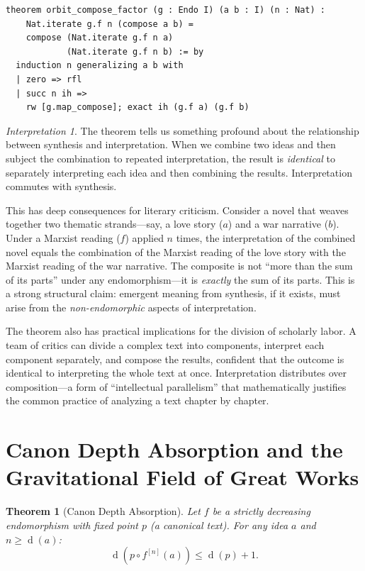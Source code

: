 \documentclass[11pt,openany]{book}
\theoremstyle{definition}
\theoremstyle{plain}
\newtheorem{theorem}[axiom]{Theorem}
\theoremstyle{remark}
\newtheorem{interpretation}[axiom]{Interpretation}
\newcommand{\compose}{\circ}                 %
\newcommand{\depth}{\operatorname{d}}       %
\begin{document}
\begin{lstlisting}[language=Lean4]
theorem orbit_compose_factor (g : Endo I) (a b : I) (n : Nat) :
    Nat.iterate g.f n (compose a b) =
    compose (Nat.iterate g.f n a)
            (Nat.iterate g.f n b) := by
  induction n generalizing a b with
  | zero => rfl
  | succ n ih =>
    rw [g.map_compose]; exact ih (g.f a) (g.f b)
\end{lstlisting}

\begin{interpretation}
The theorem tells us something profound about the relationship between synthesis and interpretation. When we combine two ideas and then subject the combination to repeated interpretation, the result is \emph{identical} to separately interpreting each idea and then combining the results. Interpretation commutes with synthesis.

This has deep consequences for literary criticism. Consider a novel that weaves together two thematic strands---say, a love story ($a$) and a war narrative ($b$). Under a Marxist reading ($f$) applied $n$ times, the interpretation of the combined novel equals the combination of the Marxist reading of the love story with the Marxist reading of the war narrative. The composite is not ``more than the sum of its parts'' under any endomorphism---it is \emph{exactly} the sum of its parts. This is a strong structural claim: emergent meaning from synthesis, if it exists, must arise from the \emph{non-endomorphic} aspects of interpretation.

The theorem also has practical implications for the division of scholarly labor. A team of critics can divide a complex text into components, interpret each component separately, and compose the results, confident that the outcome is identical to interpreting the whole text at once. Interpretation distributes over composition---a form of ``intellectual parallelism'' that mathematically justifies the common practice of analyzing a text chapter by chapter.
\end{interpretation}

\section{Canon Depth Absorption and the Gravitational Field of Great Works}

\begin{theorem}[Canon Depth Absorption]
\label{thm:canon-absorption-ch10}
Let $f$ be a strictly decreasing endomorphism with fixed point $p$ (a canonical text). For any idea $a$ and $n \geq \depth(a)$:
\[
\depth(p \compose f^{[n]}(a)) \leq \depth(p) + 1.
\]
\end{theorem}
\end{document}
